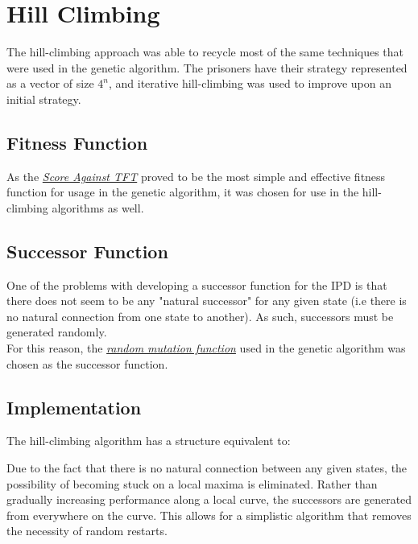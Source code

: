 \documentclass[12pt]{article}
\begin{document}
\section{Hill Climbing}

The hill-climbing approach was able to recycle most of the same techniques that
were used in the genetic algorithm. The prisoners have their strategy
represented as a vector of size $4^n$, and iterative hill-climbing was used
to improve upon an initial strategy.

\subsection {Fitness Function}

As the \textit{\hyperref[tft]{Score Against TFT}} proved to be the most simple
and effective fitness function for usage in the genetic algorithm, it was
chosen for use in the hill-climbing algorithms as well.

\subsection {Successor Function}

One of the problems with developing a successor function for the IPD is that
there does not seem to be any "natural successor" for any given state (i.e
there is no natural connection from one state to another). As such, successors
must be generated randomly.\\

For this reason, the \textit{\hyperref[mutation]{random mutation function}}
used in the genetic algorithm was chosen as the successor function.

\subsection {Implementation}

The hill-climbing algorithm has a structure equivalent to: \\

\begin{algorithm}[H]
\end{algorithm}

Due to the fact that there is no natural connection between any given states,
the possibility of becoming stuck on a local maxima is eliminated. Rather than
gradually increasing performance along a local curve, the successors are
generated from everywhere on the curve. This allows for a simplistic algorithm
that removes the necessity of random restarts.
\end{document}
